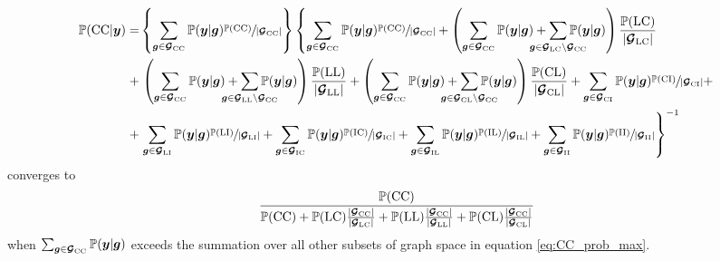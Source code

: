 \documentclass{article}
\begin{document}
\begin{align} 
    \mathbb{P}(\recru\recru | \bm{y}) = 
    &\left\{
    \sum_{\rg\in\RG_{\recru\recru}} \mathbb{P}(\bm{y} | \rg) 
    \sfrac{\mathbb{P}(\recru\recru)}{|\RG_{\recru\recru}|} 
    \right\} \left\{
    \sum_{\rg\in\RG_{\recru\recru}} \mathbb{P}(\bm{y} | \rg) 
    \sfrac{\mathbb{P}(\recru\recru)}{|\RG_{\recru\recru}|}  
    + \left(
    \sum_{\rg\in\RG_{\recru\recru}} \mathbb{P}(\bm{y} | \rg) + 
    \smashoperator{\sum_{\rg\in\RG_{\relap\recru}\setminus\RG_{\recru\recru}}} 
    \mathbb{P}(\bm{y} | \rg)
    \right) \frac{\mathbb{P}(\relap\recru)}{|\RG_{\relap\recru}|}
    \right.  \nonumber \\ 
    + &\left. 
    \left(
    \sum_{\rg\in\RG_{\recru\recru}} \mathbb{P}(\bm{y} | \rg) +
    \smashoperator{\sum_{\rg\in\RG_{\relap\relap}\setminus\RG_{\recru\recru}}}
    \mathbb{P}(\bm{y} | \rg) \right) \frac{\mathbb{P}(\relap\relap)}{|\RG_{\relap\relap}|} 
    + 
    \left(
    \sum_{\rg\in\RG_{\recru\recru}} \mathbb{P}(\bm{y} | \rg) +
    \smashoperator{\sum_{\rg\in\RG_{\recru\relap}\setminus\RG_{\recru\recru}}}
    \mathbb{P}(\bm{y} | \rg) \right) \frac{\mathbb{P}(\recru\relap)}{|\RG_{\recru\relap}|}
    + \sum_{\rg\in\RG_{\recru\reinf}} \mathbb{P}(\bm{y} | \rg) 
    \sfrac{\mathbb{P}(\recru\reinf)}{|\RG_{\recru\reinf}|} +
    \right. \nonumber \\ 
    + &\left. 
    \sum_{\rg\in\RG_{\relap\reinf}} \mathbb{P}(\bm{y} | \rg) 
    \sfrac{\mathbb{P}(\relap\reinf)}{|\RG_{\relap\reinf}|} + 
    \sum_{\rg\in\RG_{\reinf\recru}} \mathbb{P}(\bm{y} | \rg) 
    \sfrac{\mathbb{P}(\reinf\recru)}{|\RG_{\reinf\recru}|} + 
    \sum_{\rg\in\RG_{\reinf\relap}} \mathbb{P}(\bm{y} | \rg) 
    \sfrac{\mathbb{P}(\reinf\relap)}{|\RG_{\reinf\relap}|} + 
    \sum_{\rg\in\RG_{\reinf\reinf}} \mathbb{P}(\bm{y} | \rg) 
    \sfrac{\mathbb{P}(\reinf\reinf)}{|\RG_{\reinf\reinf}|} 
    \right\}^{-1} \label{eq:CC_prob_max}
\end{align}
converges to 
\begin{equation*} 
\dfrac{
\mathbb{P}(\mathrm{C}\mathrm{C})}{
\mathbb{P}(\mathrm{C}\mathrm{C}) + 
\mathbb{P}(\mathrm{L}\mathrm{C})\frac{|\bm{\mathcal{G}}_{\mathrm{C}\mathrm{C}}|}{|\bm{\mathcal{G}}_{\mathrm{L}\mathrm{C}}|} + 
\mathbb{P}(\mathrm{L}\mathrm{L})\frac{|\bm{\mathcal{G}}_{\mathrm{C}\mathrm{C}}|}{|\bm{\mathcal{G}}_{\mathrm{L}\mathrm{L}}|} + 
\mathbb{P}(\mathrm{C}\mathrm{L})\frac{|\bm{\mathcal{G}}_{\mathrm{C}\mathrm{C}}|}{|\bm{\mathcal{G}}_{\mathrm{C}\mathrm{L}}|}}  
\end{equation*}
when $\sum_{\bm{g}\in\bm{\mathcal{G}}_{\mathrm{C}\mathrm{C}}} \mathbb{P}(\bm{y} | \bm{g})$ exceeds the summation over all other subsets of graph space in equation \eqref{eq:CC_prob_max}. 
\end{document}

